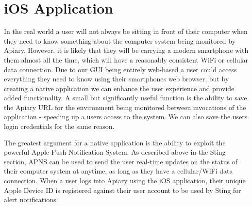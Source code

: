 \section{iOS Application}

In the real world a user will not always be sitting in front of their computer
when they need to know something about the computer system being monitored by
Apiary. However, it is likely that they will be carrying a modern smartphone
with them almost all the time, which will have a reasonably consistent WiFi or
cellular data connection. Due to our GUI being entirely web-based a user could
access everything they need to know using their smartphones web browser, but by
creating a native application we can enhance the user experience and provide
added functionality. A small but significantly useful function is the ability to
save the Apiary URL for the environment being monitored between invocations of
the application - speeding up a users access to the system. We can also save the
users login credentials for the same reason.

The greatest argument for a native application is the ability to exploit the
powerful Apple Push Notification System. As described above in the Sting
section, APNS can be used to send the user real-time updates on the status of
their computer system at anytime, as long as they have a cellular/WiFi data
connection. When a user logs into Apiary using the iOS application, their
unique Apple Device ID is registered against their user account to be used by
Sting for alert notifications.
